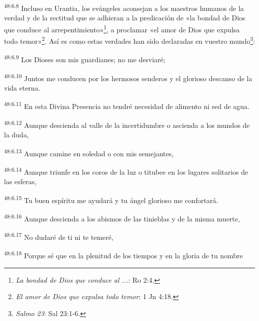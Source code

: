 \par
\textsuperscript{48:6.8} Incluso en Urantia, los evángeles aconsejan a los maestros humanos de la verdad y de la rectitud que se adhieran a la predicación de «la bondad de Dios que conduce al arrepentimiento»\footnote{\textit{La bondad de Dios que conduce al ...}: Ro 2:4.}, a proclamar «el amor de Dios que expulsa todo temor»\footnote{\textit{El amor de Dios que expulsa todo temor}: 1 Jn 4:18.}. Así es como estas verdades han sido declaradas en vuestro mundo\footnote{\textit{Salmo 23}: Sal 23:1-6.}:

\par
\textsuperscript{48:6.9} Los Dioses son mis guardianes; no me desviaré;

\par
\textsuperscript{48:6.10} Juntos me conducen por los hermosos senderos y el glorioso descanso de la vida eterna.

\par
\textsuperscript{48:6.11} En esta Divina Presencia no tendré necesidad de alimento ni sed de agua.

\par
\textsuperscript{48:6.12} Aunque descienda al valle de la incertidumbre o ascienda a los mundos de la duda,

\par
\textsuperscript{48:6.13} Aunque camine en soledad o con mis semejantes,

\par
\textsuperscript{48:6.14} Aunque triunfe en los coros de la luz o titubee en los lugares solitarios de las esferas,

\par
\textsuperscript{48:6.15} Tu buen espíritu me ayudará y tu ángel glorioso me confortará.

\par
\textsuperscript{48:6.16} Aunque descienda a los abismos de las tinieblas y de la misma muerte,

\par
\textsuperscript{48:6.17} No dudaré de ti ni te temeré,

\par
\textsuperscript{48:6.18} Porque sé que en la plenitud de los tiempos y en la gloria de tu nombre

